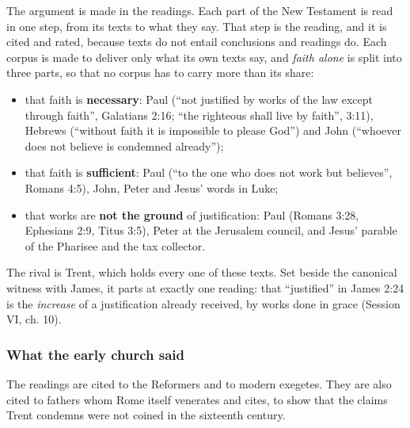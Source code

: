 \documentclass[11pt,paper=\testimonypaper,DIV=13,parskip=false]{scrartcl}
\begin{document}
The argument is made in the readings. Each part of the New Testament is read in one step, from its texts to what they say. That step is the reading, and it is cited and rated, because texts do not entail conclusions and readings do. Each corpus is made to deliver only what its own texts say, and \emph{faith alone} is split into three parts, so that no corpus has to carry more than its share:

\begin{itemize}
  \item that faith is \textbf{necessary}: Paul (“not justified by works of the law except through faith”, Galatians 2:16; “the righteous shall live by faith”, 3:11), Hebrews (“without faith it is impossible to please God”) and John (“whoever does not believe is condemned already”);
  \item that faith is \textbf{sufficient}: Paul (“to the one who does not work but believes”, Romans 4:5), John, Peter and Jesus’ words in Luke;
  \item that works are \textbf{not the ground} of justification: Paul (Romans 3:28, Ephesians 2:9, Titus 3:5), Peter at the Jerusalem council, and Jesus’ parable of the Pharisee and the tax collector.
\end{itemize}
The rival is Trent, which holds every one of these texts. Set beside the canonical witness with James, it parts at exactly one reading: that “justified” in James 2:24 is the \emph{increase} of a justification already received, by works done in grace (Session VI, ch. 10).

\subsubsection*{What the early church said}
The readings are cited to the Reformers and to modern exegetes. They are also cited to fathers whom Rome itself venerates and cites, to show that the claims Trent condemns were not coined in the sixteenth century.
\end{document}
